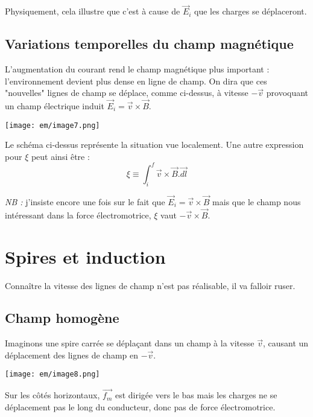 \documentclass[british,french,11pt, a4paper, openany]{book}
\begin{document}
Physiquement, cela illustre que c'est à cause de $\vec{E}_i$ que les charges se déplaceront.

\subsection{Variations temporelles du champ magnétique}
L'augmentation du courant rend le champ magnétique plus important : l'environnement devient plus dense en ligne de champ. On dira que ces "nouvelles" lignes de champ se déplace, comme ci-dessus, à vitesse $-\vec{v}$ provoquant un champ électrique induit $\vec{E}_i = \vec{v} \times \vec{B}$.
\begin{center}
	\texttt{[image: em/image7.png]}\\
\end{center}
Le schéma ci-dessus représente la situation vue localement. Une autre expression pour $\xi$ peut ainsi être :
\begin{equation}
	\xi \equiv \int_i^f \vec{v} \times \vec{B}.\vec{dl}
\end{equation}


\textit{NB :} j'insiste encore une fois sur le fait que $\vec{E}_i = \vec{v} \times \vec{B}$ mais que le champ nous intéressant dans la force électromotrice, $\xi$ vaut $-\vec{v} \times \vec{B}$.


\section{Spires et induction}
Connaître la vitesse des lignes de champ n'est pas réalisable, il va falloir ruser.

\subsection{Champ homogène}
Imaginons une spire carrée se déplaçant dans un champ à la vitesse $\vec{v}$, causant un déplacement des lignes de champ en $-\vec{v}$. 
\begin{center}
	\texttt{[image: em/image8.png]}\\
\end{center}
Sur les côtés horizontaux, $\vec{f_m}$ est dirigée vers le bas mais les charges ne se déplacement pas le long du conducteur, donc pas de force électromotrice.\\
\end{document}
